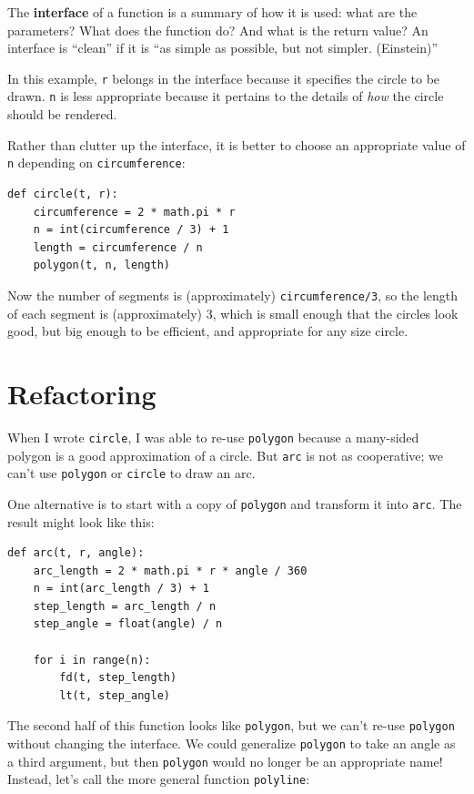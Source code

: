 \documentclass[10pt]{book}
\begin{document}
The {\bf interface} of a function is a summary of how it is used: what
are the parameters?  What does the function do?  And what is the return
value?  An interface is ``clean'' if it is ``as simple as
possible, but not simpler. (Einstein)''

In this example, {\tt r} belongs in the interface because it
specifies the circle to be drawn.  {\tt n} is less appropriate
because it pertains to the details of {\em how} the circle should
be rendered.

Rather than clutter up the interface, it is better
to choose an appropriate value of {\tt n}
depending on {\tt circumference}:

\begin{verbatim}
def circle(t, r):
    circumference = 2 * math.pi * r
    n = int(circumference / 3) + 1
    length = circumference / n
    polygon(t, n, length)
\end{verbatim}
%
Now the number of segments is (approximately) {\tt circumference/3},
so the length of each segment is (approximately) 3, which is small
enough that the circles look good, but big enough to be efficient,
and appropriate for any size circle.


\section{Refactoring}
\label{refactoring}

When I wrote {\tt circle}, I was able to re-use {\tt polygon}
because a many-sided polygon is a good approximation of a circle.
But {\tt arc} is not as cooperative; we can't use {\tt polygon}
or {\tt circle} to draw an arc.

One alternative is to start with a copy
of {\tt polygon} and transform it into {\tt arc}.  The result
might look like this:

\begin{verbatim}
def arc(t, r, angle):
    arc_length = 2 * math.pi * r * angle / 360
    n = int(arc_length / 3) + 1
    step_length = arc_length / n
    step_angle = float(angle) / n
    
    for i in range(n):
        fd(t, step_length)
        lt(t, step_angle)
\end{verbatim}
%
The second half of this function looks like {\tt polygon}, but we
can't re-use {\tt polygon} without changing the interface.  We could
generalize {\tt polygon} to take an angle as a third argument,
but then {\tt polygon} would no longer be an appropriate name!
Instead, let's call the more general function {\tt polyline}:
\end{document}
